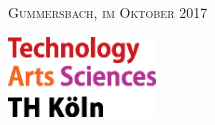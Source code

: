 \begin{titlepage}
\begin{center}
      \textsc{Gummersbach, im Oktober 2017}

    \end{center}

    \vspace{\fill}

    \begin{flushright}
    \includegraphics[height=60pt]{./assets/logo_th-koeln.eps}
    \end{flushright}
    \vspace{-3cm}

\end{titlepage}
